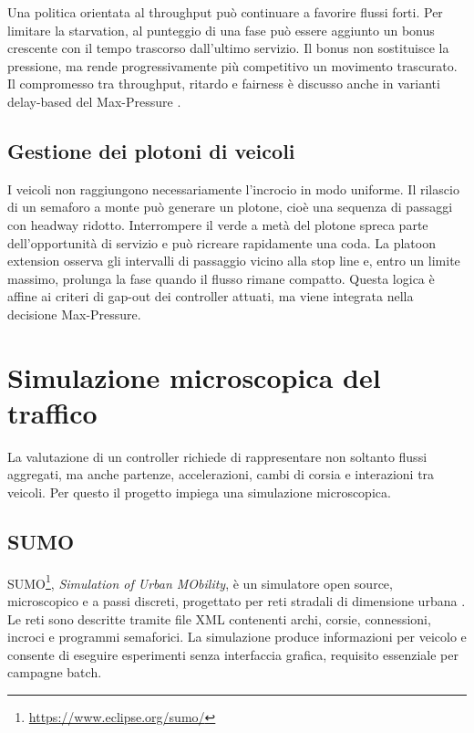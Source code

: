 \documentclass[12pt,a4paper,oneside]{report}
\numberwithin{equation}{chapter}
\begin{document}
Una politica orientata al throughput può continuare a favorire flussi forti.
Per limitare la starvation, al punteggio di una fase può essere aggiunto un
bonus crescente con il tempo trascorso dall'ultimo servizio. Il bonus non
sostituisce la pressione, ma rende progressivamente più competitivo un
movimento trascurato. Il compromesso tra throughput, ritardo e fairness è
discusso anche in varianti delay-based del Max-Pressure
\cite{wu2018fairness,liu2022delay}.

\subsection{Gestione dei plotoni di veicoli}

I veicoli non raggiungono necessariamente l'incrocio in modo uniforme. Il
rilascio di un semaforo a monte può generare un plotone, cioè una sequenza di
passaggi con headway ridotto. Interrompere il verde a metà del plotone spreca
parte dell'opportunità di servizio e può ricreare rapidamente una coda. La
platoon extension osserva gli intervalli di passaggio vicino alla stop line e,
entro un limite massimo, prolunga la fase quando il flusso rimane compatto.
Questa logica è affine ai criteri di gap-out dei controller attuati, ma viene
integrata nella decisione Max-Pressure.

\section{Simulazione microscopica del traffico}

La valutazione di un controller richiede di rappresentare non soltanto flussi
aggregati, ma anche partenze, accelerazioni, cambi di corsia e interazioni tra
veicoli. Per questo il progetto impiega una simulazione microscopica.

\subsection{SUMO}

SUMO\footnote{\url{https://www.eclipse.org/sumo/}}, \emph{Simulation of Urban MObility}, è un simulatore open source,
microscopico e a passi discreti, progettato per reti stradali di dimensione
urbana \cite{behrisch2011sumo,sumodocs2026}. Le reti sono descritte tramite file
XML contenenti archi, corsie, connessioni, incroci e programmi semaforici. La
simulazione produce informazioni per veicolo e consente di eseguire esperimenti
senza interfaccia grafica, requisito essenziale per campagne batch.
\end{document}
